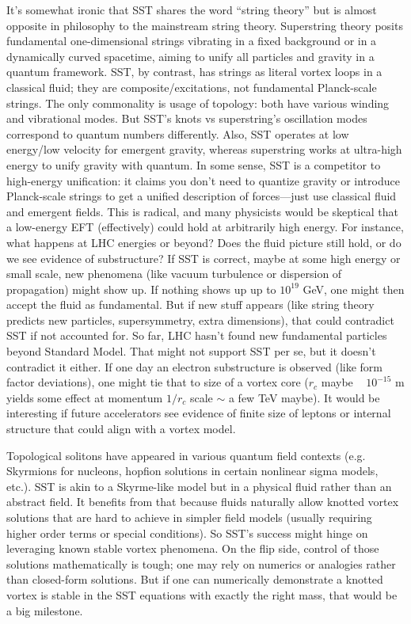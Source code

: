 \documentclass[10pt,reprint,aps,onecolumn,nofootinbib]{revtex4-2}
\begin{document}
It’s somewhat ironic that SST shares the word “string theory” but is almost opposite in philosophy to the mainstream string theory. Superstring theory posits fundamental one-dimensional strings vibrating in a fixed background or in a dynamically curved spacetime, aiming to unify all particles and gravity in a quantum framework. SST, by contrast, has strings as literal vortex loops in a classical fluid; they are composite/excitations, not fundamental Planck-scale strings. The only commonality is usage of topology: both have various winding and vibrational modes. But SST’s knots vs superstring’s oscillation modes correspond to quantum numbers differently. Also, SST operates at low energy/low velocity for emergent gravity, whereas superstring works at ultra-high energy to unify gravity with quantum. In some sense, SST is a competitor to high-energy unification: it claims you don’t need to quantize gravity or introduce Planck-scale strings to get a unified description of forces—just use classical fluid and emergent fields. This is radical, and many physicists would be skeptical that a low-energy EFT (effectively) could hold at arbitrarily high energy. For instance, what happens at LHC energies or beyond? Does the fluid picture still hold, or do we see evidence of substructure? If SST is correct, maybe at some high energy or small scale, new phenomena (like vacuum turbulence or dispersion of propagation) might show up. If nothing shows up up to $10^{19}$ GeV, one might then accept the fluid as fundamental. But if new stuff appears (like string theory predicts new particles, supersymmetry, extra dimensions), that could contradict SST if not accounted for. So far, LHC hasn’t found new fundamental particles beyond Standard Model. That might not support SST per se, but it doesn’t contradict it either. If one day an electron substructure is observed (like form factor deviations), one might tie that to size of a vortex core ($r_c$ maybe ~ $10^{-15}$ m yields some effect at momentum $1/r_c$ scale $\sim$ a few TeV maybe). It would be interesting if future accelerators see evidence of finite size of leptons or internal structure that could align with a vortex model.


Topological solitons have appeared in various quantum field contexts (e.g. Skyrmions for nucleons, hopfion solutions in certain nonlinear sigma models, etc.). SST is akin to a Skyrme-like model but in a physical fluid rather than an abstract field. It benefits from that because fluids naturally allow knotted vortex solutions that are hard to achieve in simpler field models (usually requiring higher order terms or special conditions). So SST’s success might hinge on leveraging known stable vortex phenomena. On the flip side, control of those solutions mathematically is tough; one may rely on numerics or analogies rather than closed-form solutions. But if one can numerically demonstrate a knotted vortex is stable in the SST equations with exactly the right mass, that would be a big milestone.
\end{document}
